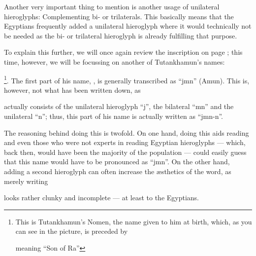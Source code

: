 \documentclass[a5paper,twoside,11pt]{report}
\begin{document}
		Another very important thing to mention is another usage of unilateral hieroglyphs: Complementing bi- or trilaterals. This basically means that the Egyptians frequently added a unilateral hieroglyph where it would technically not be needed as the bi- or trilateral hieroglyph is already fulfilling that purpose.

		To explain this further, we will once again review the inscription on page \pageref{fig:1}; this time, however, we will be focussing on another of Tutankhamun’s names: \begin{hieroglyph}{\leavevmode {}\HinterSignsSpace
\negAROBspace\negAROBspace{}\HwordSpace
{}%
}\end{hieroglyph}\footnote{This is Tutankhamun’s Nomen, the name given to him at birth, which, as you can see in the picture, is preceded by \begin{hieroglyph}{\leavevmode {}\HinterSignsSpace
\negAROBspace\negAROBspace{}}\end{hieroglyph} meaning “Son of Ra”}. The first part of his name, , is generally transcribed as “jmn” (Amun). This is, however, not what has been written down, as \begin{hieroglyph}{\leavevmode {}\HinterSignsSpace
{}}\end{hieroglyph} actually consists of the unilateral hieroglyph “j”, the bilateral “mn” and the unilateral “n”; thus, this part of his name is actually written as “jmn-n”.

		The reasoning behind doing this is twofold. On one hand, doing this aids reading and even those who were not experts in reading Egyptian hieroglyphs — which, back then, would have been the majority of the population — could easily guess that this name would have to be pronounced as “jmn”. On the other hand, adding a second hieroglyph can often increase the æsthetics of the word, as merely writing \begin{hieroglyph}{\leavevmode {}\HinterSignsSpace
{}}\end{hieroglyph} looks rather clunky and incomplete — at least to the Egyptians.
\end{document}

